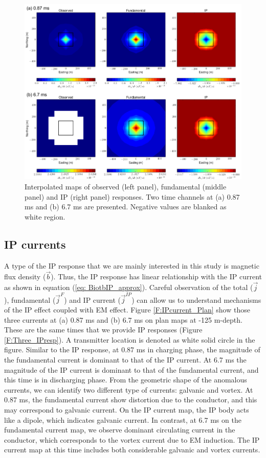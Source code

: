 \documentclass[a4paper, 11pt]{article}
\renewcommand {\j}  { {\vec j} }
\renewcommand {\b}  { {\vec b} }
\begin{document}
\begin{figure}[htb]
  \centering
  \includegraphics[width=1.\textwidth]{figures/IPresp_Plan.png}
  \caption{Interpolated maps of observed (left panel), fundamental (middle panel) and IP (right panel) responses. Two time channels at (a) 0.87 ms and (b) 6.7 ms are presented. 
  Negative values are blanked as white region.
  }
  \label{F:IPresp_Plan}
\end{figure}
\clearpage

\subsection{IP currents}
A type of the IP response that we are mainly interested in this study is magnetic flux density ($\b$). 
Thus, the IP response has linear relationship with the IP current as shown in equation (\ref{eq: BiotbIP_approx}).
Careful observation of the total ($\j$), fundamental ($\j^F$) and IP current ($\j^{IP}$) can allow us to understand mechanisms of the IP effect coupled with EM effect. 
Figure \ref{F:IPcurrent_Plan} show those three currents at (a) 0.87 ms and (b) 6.7 ms on plan maps at -125 m-depth. These are the same times that we provide IP responses (Figure \ref{F:Three_IPresp}). 
A transmitter location is denoted as white solid circle in the figure. 
Similar to the IP response, at 0.87 ms in charging phase, the magnitude of the fundamental current is dominant to that of the IP current. 
At 6.7 ms the magnitude of the IP current is dominant to that of the fundamental current, and this time is in discharging phase. 
From the geometric shape of the anomalous currents, we can identify two different type of currents: galvanic and vortex. 
At 0.87 ms, the fundamental current show distortion due to the conductor, and this may correspond to galvanic current. 
On the IP current map, the IP body acts like a dipole, which indicates galvanic current. 
In contrast, at 6.7 ms on the fundamental current map, we observe dominant circulating current in the conductor, which corresponds to the vortex current due to EM induction. 
The IP current map at this time includes both considerable galvanic and vortex currents. 
\end{document}
